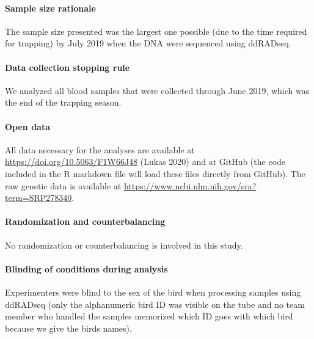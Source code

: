 \documentclass[
]{article}
\begin{document}
\hypertarget{sample-size-rationale}{%
\paragraph{Sample size rationale}\label{sample-size-rationale}}

The sample size presented was the largest one possible (due to the time
required for trapping) by July 2019 when the DNA were sequenced using
ddRADseq.

\hypertarget{data-collection-stopping-rule}{%
\paragraph{Data collection stopping
rule}\label{data-collection-stopping-rule}}

We analyzed all blood samples that were collected through June 2019,
which was the end of the trapping season.

\hypertarget{open-data}{%
\paragraph{Open data}\label{open-data}}

All data necessary for the analyses are available at
\url{https://doi.org/10.5063/F1W66J48} (Lukas 2020) and at GitHub (the
code included in the R markdown file will load these files directly from
GitHub). The raw genetic data is available at
\url{https://www.ncbi.nlm.nih.gov/sra?term=SRP278340}.

\hypertarget{randomization-and-counterbalancing}{%
\paragraph{Randomization and
counterbalancing}\label{randomization-and-counterbalancing}}

No randomization or counterbalancing is involved in this study.

\hypertarget{blinding-of-conditions-during-analysis}{%
\paragraph{Blinding of conditions during
analysis}\label{blinding-of-conditions-during-analysis}}

Experimenters were blind to the sex of the bird when processing samples
using ddRADseq (only the alphanumeric bird ID was visible on the tube
and no team member who handled the samples memorized which ID goes with
which bird because we give the birds names).
\end{document}
